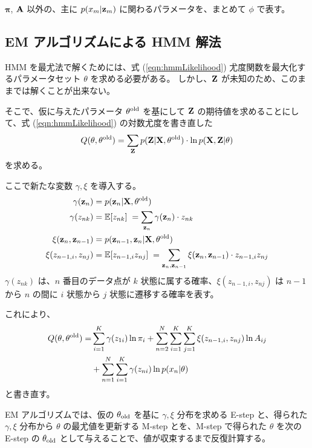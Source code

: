${\boldsymbol \pi}$, ${\bf A}$ 以外の、主に $p( x_m | {\bf z}_m )$ に関わるパラメータを、まとめて $\phi$ で表す。

\subsection{ EM アルゴリズムによる HMM 解法 }

HMM を最尤法で解くためには、式 (\ref{eqn:hmmLikelihood}) 尤度関数を最大化するパラメータセット $\theta$ を求める必要がある。
しかし、${\bf Z}$ が未知のため、このままでは解くことが出来ない。

そこで、仮に与えたパラメータ $\theta^{\rm old}$ を基にして ${\bf Z}$ の期待値を求めることにして、式 (\ref{eqn:hmmLikelihood}) の対数尤度を書き直した
\begin{equation}
  Q( {\bf \theta}, {\bf \theta}^{\rm old} )  =  \sum_{\bf Z} p({\bf Z}|{\bf X}, {\bf \theta}^{\rm old}) \cdot \ln p({\bf X}, {\bf Z} | {\bf \theta})
\end{equation}
を求める。

ここで新たな変数 $\gamma, \xi$ を導入する。
\begin{align}
  \gamma({\bf z}_n)  &=  p( {\bf z}_n | {\bf X}, {\bf \theta}^{\rm old} )  \\
  \gamma(z_{nk})  &=  \mathbb{E}[ z_{nk} ] \; =  \sum_{{\bf z}_n} \gamma({\bf z}_n) \cdot z_{nk}  \\
  \xi({\bf z}_n, {\bf z}_{n-1})  &=  p( {\bf z}_{n-1}, {\bf z}_n | {\bf X}, {\bf \theta}^{\rm old} )  \\
  \xi( z_{n-1,i}, z_{nj} )  &=  \mathbb{E}[ z_{n-1, i} z_{nj} ] \; =  \sum_{{\bf z}_n, {\bf z}_{n-1}} \xi({\bf z}_n, {\bf z}_{n-1}) \cdot z_{n-1, i} z_{nj}
\end{align}
$\gamma(z_{nk})$ は、$n$ 番目のデータ点が $k$ 状態に属する確率、$\xi( z_{n-1, i}, z_{nj} )$ は $n-1$ から $n$ の間に $i$ 状態から $j$ 状態に遷移する確率を表す。

これにより、
\begin{align}
  Q( {\bf \theta}, {\bf \theta}^{\rm old} )  =&  \sum_{i=1}^K \gamma(z_{1i}) \ln \pi_i  
      + \sum_{n=2}^N \sum_{i=1}^K \sum_{j=1}^K \xi( z_{n-1, i}, z_{nj} ) \ln A_{ij}  \notag  \\  
    &  + \sum_{n=1}^N \sum_{i=1}^K \gamma(z_{ni}) \ln p( x_n | \theta )
\end{align}
と書き直す。

EM アルゴリズムでは、仮の $\theta_{\rm old}$ を基に $\gamma, \xi$ 分布を求める E-step と、得られた $\gamma, \xi$ 分布から $\theta$ の最尤値を更新する M-step とを、M-step で得られた $\theta$ を次の E-step の $\theta_{\rm old}$ として与えることで、値が収束するまで反復計算する。

